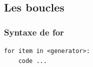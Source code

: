 \subsection{Les boucles}
\begin{frame}[fragile]
  \frametitle{Syntaxe de for}
  \begin{lstlisting}
for item in <generator>:
    code ...
  \end{lstlisting}
\end{frame}


